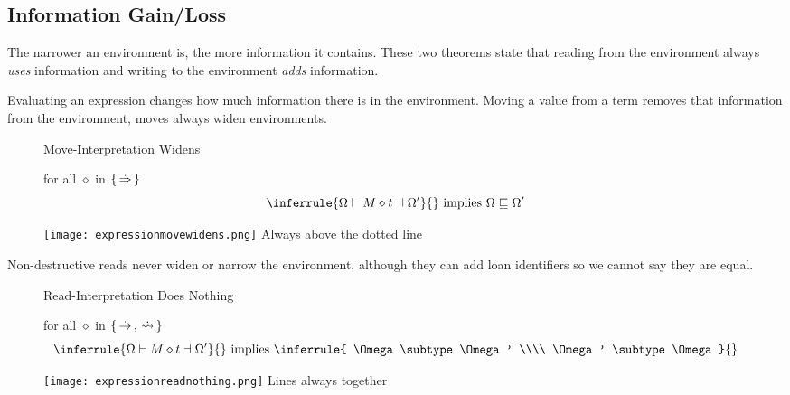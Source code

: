 \documentclass[12pt,twoside]{report}
\begin{document}

\subsection{Information Gain/Loss}
The narrower an environment is, the more information it contains. These two theorems state that reading from the environment always \textit{uses} information and writing to the environment \textit{adds} information.

Evaluating an expression changes how much information there is in the environment. Moving a value from a term removes that information from the environment, moves always widen environments.

\begin{figure}[H]
\begin{Property}{Move-Interpretation Widens}{} %
  \begin{minipage}{0.6\textwidth}
    \centering
    for all $\diamond$ in $\{ \,\stackrel{.}{\Rightarrow}\, \}$
    \[
      \inferrule{
        \Omega \vdash M \diamond t \dashv \Omega'
      }{}
      \text{   implies   }
      \Omega \subtype \Omega'
    \]
  \end{minipage}
  \begin{minipage}{0.3\textwidth}
    \centering
    \texttt{[image: expressionmovewidens.png]}
    Always above the dotted line
  \end{minipage}
\end{Property}
\label{theorem:expressionmovewidens}
\end{figure}

Non-destructive reads never widen or narrow the environment, although they can add loan identifiers so we cannot say they are equal.

\begin{figure}[H]
\begin{Property}{Read-Interpretation Does Nothing}{} %
  \begin{minipage}{0.6\textwidth}
    \centering
    for all $\diamond$ in $\{ \,\stackrel{.}{\rightarrow}\,, \,\dot{\rightsquigarrow}\, \}$
    \[
      \inferrule{
        \Omega \vdash M \diamond t \dashv \Omega'
      }{}
      \text{   implies   }
      \inferrule{
        \Omega \subtype \Omega' \\\\
        \Omega' \subtype \Omega
      }{}
    \]
  \end{minipage}
  \begin{minipage}{0.3\textwidth}
    \centering
    \texttt{[image: expressionreadnothing.png]}
    Lines always together
  \end{minipage}
\end{Property}
\label{theorem:expressionreadnothing}
\end{figure}
\end{document}
